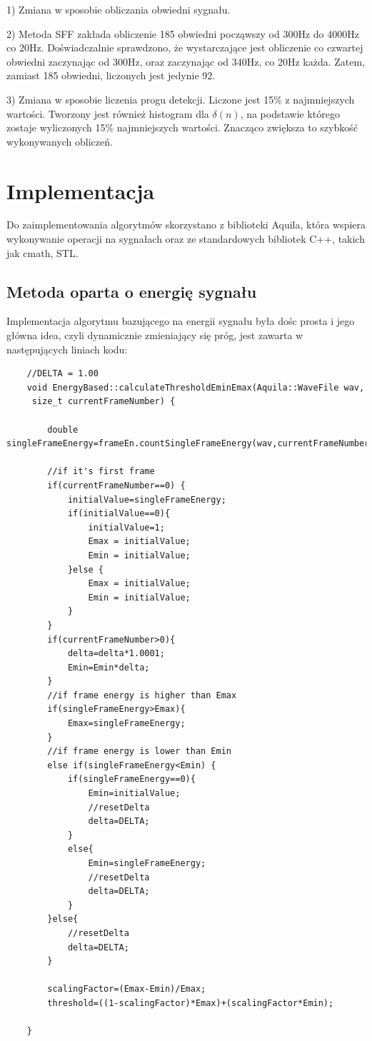 \documentclass[eng,printmode]{mgr}
\begin{document}
1) Zmiana w sposobie obliczania obwiedni sygnału.\vspace{5mm}

2) Metoda SFF zakłada obliczenie 185 obwiedni począwszy od 300Hz do 4000Hz co 20Hz. Doświadczalnie sprawdzono, że wystarczające jest obliczenie co czwartej obwiedni zaczynając od 300Hz, oraz zaczynając od 340Hz, co 20Hz każda. Zatem, zamiast 185 obwiedni, liczonych jest jedynie 92. \vspace{5mm}

3) Zmiana w sposobie liczenia progu detekcji. Liczone jest 15\% z najmniejszych wartości. Tworzony jest również histogram dla $\delta(n)$, na podstawie którego zostaje wyliczonych 15\% najmniejszych wartości. Znacząco zwiększa to szybkość wykonywanych obliczeń.\vspace{5mm}



\chapter{Implementacja}
Do zaimplementowania algorytmów skorzystano z biblioteki Aquila, która wspiera wykonywanie operacji na sygnałach oraz ze standardowych bibliotek C++, takich jak cmath, STL.

\section{Metoda oparta o energię sygnału}
Implementacja algorytmu bazującego na energii sygnału była dośc prosta i jego główna idea, czyli dynamicznie zmieniający się próg, jest zawarta w następujących liniach kodu:
\lstset{language=C++,basicstyle=\scriptsize}
\begin{lstlisting}
	//DELTA = 1.00
	void EnergyBased::calculateThresholdEminEmax(Aquila::WaveFile wav,
	 size_t currentFrameNumber) {
		
		double singleFrameEnergy=frameEn.countSingleFrameEnergy(wav,currentFrameNumber);
		
		//if it's first frame
		if(currentFrameNumber==0) {
			initialValue=singleFrameEnergy;
			if(initialValue==0){
				initialValue=1;
				Emax = initialValue;
				Emin = initialValue;
			}else {
				Emax = initialValue;
				Emin = initialValue;
			}
		}	
		if(currentFrameNumber>0){
			delta=delta*1.0001;
			Emin=Emin*delta;
		}
		//if frame energy is higher than Emax
		if(singleFrameEnergy>Emax){
			Emax=singleFrameEnergy;
		}
		//if frame energy is lower than Emin
		else if(singleFrameEnergy<Emin) {
			if(singleFrameEnergy==0){
				Emin=initialValue;
				//resetDelta
				delta=DELTA;
			}
			else{
				Emin=singleFrameEnergy;
				//resetDelta
				delta=DELTA;
			}
		}else{
			//resetDelta
			delta=DELTA;
		}
		
		scalingFactor=(Emax-Emin)/Emax;
		threshold=((1-scalingFactor)*Emax)+(scalingFactor*Emin);
		
	}
\end{lstlisting}\vspace{5mm}
\end{document}
